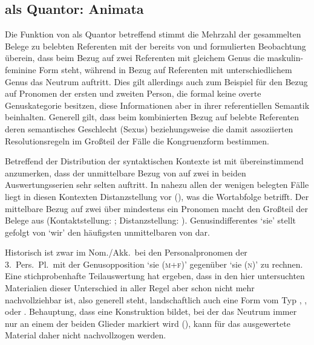 \subsection{ als Quantor: Animata}

Die Funktion von  als Quantor betreffend stimmt die Mehrzahl der
gesammelten Belege zu belebten Referenten mit der bereits von
\citet[312]{grimm1890} und \citet[39--41]{behaghel1928} formulierten
Beobachtung überein, dass beim Bezug auf zwei Referenten mit gleichem Genus die
maskulin-feminine Form steht, während in Bezug auf Referenten mit
unterschiedlichem Genus das Neutrum auftritt. Dies gilt allerdings auch zum
Beispiel für den Bezug auf Pronomen der ersten und zweiten Person, die formal
keine overte Genuskategorie besitzen, diese Informationen aber in ihrer
referentiellen Semantik beinhalten. Generell gilt, dass beim kombinierten Bezug
auf belebte Referenten deren semantisches Geschlecht (Sexus) beziehungsweise
die damit assoziierten Resolutionsregeln im Großteil der Fälle die
Kongruenzform bestimmen.

Betreffend der Distribution der syntaktischen Kontexte ist mit \citet[624,
Abbildung P~179]{ksw2} übereinstimmend anzumerken, dass der unmittelbare Bezug
von  auf zwei  in beiden Auswertungsserien sehr
selten auftritt. In nahezu allen der wenigen belegten Fälle liegt in diesen
Kontexten Distanzstellung vor (), was die Wortabfolge betrifft. Der mittelbare Bezug auf zwei
 über mindestens ein Pronomen macht den Großteil der Belege aus
(Kontaktstellung: ; Distanzstellung:
). Genus\-indifferentes  `sie'
stellt gefolgt von  `wir' den häufigsten unmittelbaren
 von  dar.

Historisch ist zwar im Nom./Akk.\ bei den Personalpronomen der
3.~Pers.\ Pl.\ mit der Genus\-opposition  `sie (\textsc{m+f})'
gegenüber  `sie (\textsc{n})' zu rechnen. Eine stichprobenhafte
Teilauswertung hat ergeben, dass in den hier untersuchten Materialien dieser
Unterschied in aller Regel aber schon nicht mehr nachvollziehbar ist, also
generell  steht, landschaftlich auch eine Form vom Typ
,
,
 oder
\autocites[vgl.][213--214]{paul2007}[369, 390--397]{ksw2}[482--483]{wmu1}.
 Behauptung, dass  eine
Konstruktion bildet, bei der das Neutrum immer nur an einem der beiden Glieder
markiert wird (), kann für das ausgewertete Material daher
nicht nachvollzogen werden.


